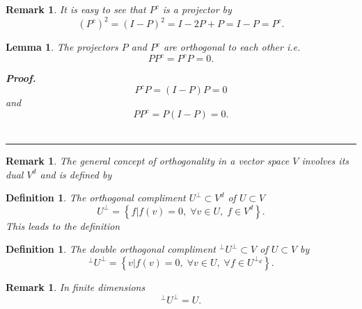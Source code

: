 \documentclass[aps,preprint]{revtex4}
\newtheorem{definition}[theorem]{Definition}
\newtheorem{lemma}[theorem]{Lemma}
\newtheorem{remark}[theorem]{Remark}
\newenvironment{proof}[1][Proof]{\noindent\textbf{#1.} }{\ \rule{0.5em}{0.5em}}
\begin{document}
\begin{remark}
It is easy to see that $P^{c}$ is a projector by 
\begin{equation}
\left( P^{c}\right) ^{2}=\left( I-P\right) ^{2}=I-2P+P=I-P=P^{c}.
\end{equation}
\end{remark}

\begin{lemma}
The projectors $P$ and $P^{c}$ are \emph{orthogonal} to each other i.e. 
\begin{equation}
PP^{c}=P^{c}P=0.
\end{equation}

\begin{proof}
\begin{equation}
P^{c}P=\left( I-P\right) P=0
\end{equation}%
and 
\begin{equation}
PP^{c}=P\left( I-P\right) =0.
\end{equation}
\end{proof}
\end{lemma}

\begin{remark}
The general concept of orthogonality in a vector space $V$ involves its dual 
$V^{d}$ and is defined by
\end{remark}

\begin{definition}
The orthogonal compliment $U^{\bot }\subset V^{d}$ of $U\subset V$ 
\begin{equation}
U^{\bot }=\left\{ \left. f\right\vert f\left( v\right) =0,\;\forall v\in
U,\;f\in V^{d}\right\} .
\end{equation}%
This leads to the definition
\end{definition}

\begin{definition}
The double orthogonal compliment $^{\bot }U^{\bot }\subset V$ of $U\subset V$
by 
\begin{equation}
^{\bot }U^{\bot }=\left\{ \left. v\right\vert f\left( v\right) =0,\;\forall
v\in U,\;\forall f\in U^{\bot _{d}}\right\} .
\end{equation}
\end{definition}

\begin{remark}
In finite dimensions 
\begin{equation}
^{\bot }U^{\bot }=U.
\end{equation}
\end{remark}
\end{document}

